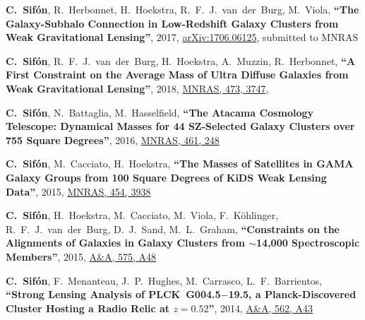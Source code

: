 \documentclass{article}
\def\myself{\textbf{\color{red} C.~Sif\'on}}
\def\aap{A\&A}
\def\mnras{MNRAS}
\newcommand{\submitted}[1]{submitted to #1}
\newcommand{\paper}[1]{\textbf{``#1''}}
\begin{document}
\vspace{-0.5cm}
\begin{etaremune}

\item
\myself, R.~Herbonnet, H.~Hoekstra, R.~F.~J.~van~der~Burg, M.~Viola,
\paper{The Galaxy-Subhalo Connection in Low-Redshift Galaxy Clusters from
Weak Gravitational Lensing},
2017, \href{http://adsabs.harvard.edu/abs/2017arXiv170606125S}{arXiv:1706.06125},
\submitted{\mnras}

\item
\myself, R.~F.~J.~van~der~Burg, H.~Hoekstra, A.~Muzzin, R.~Herbonnet,
\paper{A First Constraint on the Average Mass of Ultra Diffuse Galaxies from 
Weak Gravitational Lensing},
2018, \href{http://adsabs.harvard.edu/abs/2017arXiv170407847S}{\mnras, 473, 3747},

\item 
\myself, N.~Battaglia, M.~Hasselfield, 
\paper{The Atacama Cosmology Telescope: Dynamical Masses for 44 SZ-Selected Galaxy Clusters over 
755 Square Degrees},
2016, \href{http://adsabs.harvard.edu/abs/2016MNRAS.461..248S}{\mnras, 461, 248} 

\item
\myself, M.~Cacciato, H.~Hoekstra, 
\paper{The Masses of Satellites in GAMA Galaxy Groups from 100 Square Degrees of KiDS Weak Lensing 
Data},
2015, \href{https://adsabs.harvard.edu/abs/2015MNRAS.454.3938S}{\mnras, 454, 3938}

\item
\myself, H.~Hoekstra, M.~Cacciato, M.~Viola, F.~K\"ohlinger, R.~F.~J.~van~der~Burg, D.~J.~Sand, 
M.~L.~Graham,
\paper{Constraints on the Alignments of Galaxies in Galaxy Clusters from $\sim$14,000 Spectroscopic 
Members},
2015, \href{https://adsabs.harvard.edu/abs/2015A&A...575A..48S}{\aap, 575, A48}

\item
\myself, F.~Menanteau, J.~P.~Hughes, M.~Carrasco, L.~F.~Barrientos,
\paper{Strong Lensing Analysis of PLCK~G004.5$-$19.5, a Planck-Discovered Cluster Hosting a Radio 
Relic at $z=0.52$},
2014, \href{https://adsabs.harvard.edu/abs/2014A&A...562A..43S}{\aap, 562, A43}


\end{etaremune}
\end{document}
